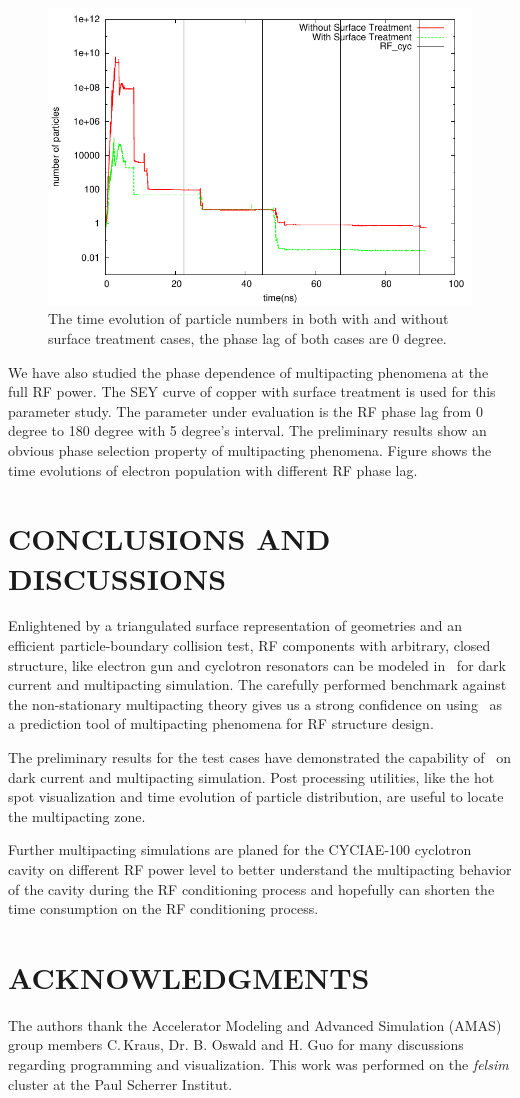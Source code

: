 \documentclass[aps,prstab,superscriptaddress,showpacs]{revtex4-1}
\begin{document}
\begin{figure}[H]
   \centering
  \includegraphics*[width=0.7\linewidth,angle=0]{figures/diff_SEY_comparison.pdf}
   \caption{The time evolution of particle numbers in both with and without surface treatment cases, the phase lag of both cases are 0 degree.}
   \label{fig:seydiff}
\end{figure}

 We have also studied the phase dependence of multipacting phenomena at the full RF power. The SEY curve of copper with surface treatment is used for this parameter study. The parameter under evaluation is the RF phase lag from 0 degree to 180 degree with 5 degree's interval. The preliminary results show an obvious phase selection property of multipacting phenomena. Figure shows the time evolutions of electron population with different RF phase lag.

  
\section{CONCLUSIONS AND DISCUSSIONS}
Enlightened by a triangulated surface representation of geometries and an efficient particle-boundary collision test, RF components with arbitrary, closed structure, like electron gun and cyclotron resonators can be modeled in \opal\ for dark current and multipacting simulation. The carefully performed benchmark against the non-stationary multipacting theory gives us a strong confidence on using \opal\ as a prediction tool of multipacting phenomena for RF structure design.

The preliminary results for the test cases have demonstrated the capability of \opal\ on dark current and multipacting simulation. Post processing utilities, like the hot spot visualization and time evolution of particle distribution, are useful to locate the multipacting zone. 

Further multipacting simulations are planed for the CYCIAE-100 cyclotron cavity on different RF power level to better understand the multipacting behavior of the cavity during the RF conditioning process and hopefully can shorten the time consumption on the RF conditioning process. 
\section{ACKNOWLEDGMENTS}
The authors thank the Accelerator Modeling and Advanced Simulation (AMAS) group members C.\,Kraus, Dr. B. Oswald and H. Guo for many discussions regarding programming and visualization. This work was performed on the {\it felsim} cluster at the Paul Scherrer Institut.


\end{document}
